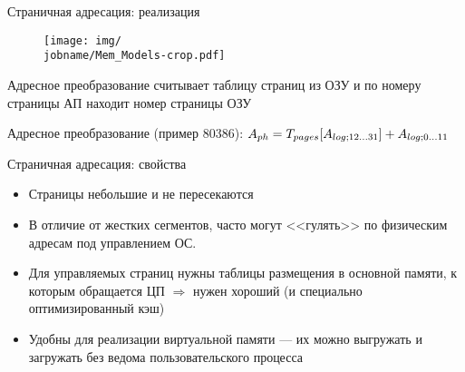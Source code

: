 \documentclass[xetex,aspectratio=43]{beamer}
\begin{document}
\begin{frame}{Страничная адресация: реализация}
    \begin{figure}
        \texttt{[image: img/\\jobname/Mem\_Models-crop.pdf]}
    \end{figure}

    Адресное преобразование считывает таблицу страниц из ОЗУ и по номеру
    страницы АП находит номер страницы ОЗУ

    Адресное преобразование (пример 80386):
    \(A_{ph} = T_{pages}[A_{log\\; 12\ldots 31}] + A_{log\\; 0\ldots 11}\)
\end{frame}



\begin{frame}{Страничная адресация: свойства}
    \begin{itemize}
        \item
        Страницы небольшие и не пересекаются
        \item
        В отличие от жестких сегментов, часто могут <<гулять>> по физическим
        адресам под управлением ОС.
        \item
        Для управляемых страниц нужны таблицы размещения в основной памяти, к
        которым обращается ЦП \(\Rightarrow\) нужен хороший (и
        специально оптимизированный кэш)
        \item
        Удобны для реализации виртуальной памяти --- их можно выгружать и
        загружать без ведома пользовательского процесса
    \end{itemize}
\end{frame}
\end{document}
